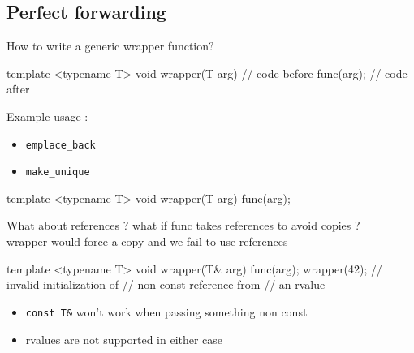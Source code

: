 \subsection[forward]{Perfect forwarding}

\begin{frame}[fragile]
  How to write a generic wrapper function?
  \begin{block}{}
    \begin{cppcode*}{}
      template <typename T>
      void wrapper(T arg) {
        // code before
        func(arg);
        // code after
      }
    \end{cppcode*}
  \end{block}
  Example usage :
  \begin{itemize}
  \item \texttt{emplace_back}
  \item \texttt{make_unique}
  \end{itemize}
\end{frame}

\begin{frame}[fragile]
  \begin{block}{}
    \begin{cppcode*}{}
      template <typename T>
      void wrapper(T arg) {
        func(arg);
      }
    \end{cppcode*}
  \end{block}
  \begin{alertblock}{What about references ?}
    what if func takes references to avoid copies ?\\
    wrapper would force a copy and we fail to use references
  \end{alertblock}
\end{frame}

\begin{frame}[fragile]
  \begin{block}{}
    \begin{cppcode*}{}
      template <typename T>
      void wrapper(T& arg) {
        func(arg);
      }
      wrapper(42);
      // invalid initialization of
      // non-const reference from
      // an rvalue
    \end{cppcode*}
  \end{block}
  \begin{alertblock}{}
    \begin{itemize}
      \item \texttt{const T&} won't work when passing something non const
      \item rvalues are not supported in either case
    \end{itemize}
  \end{alertblock}
\end{frame}

